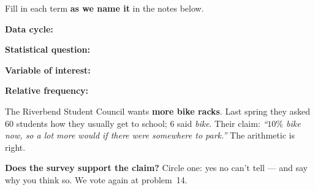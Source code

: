 \documentclass[12pt]{article}
\newcommand{\termrowheight}{2.3cm}
\newlength{\termrowinset}\setlength{\termrowinset}{7pt}
\newcommand{\vterm}[1]{%
  \par\noindent\begin{minipage}[t][\termrowheight][t]{\linewidth}%
    \vspace*{\termrowinset}%
    \textbf{\textcolor{cerulean}{#1:}}%
  \end{minipage}\par}
\begin{document}

\vspace{0.15in}

\begin{vocabbox}
\small
Fill in each term \textbf{as we name it} in the notes below.
\vterm{Data cycle}
\vterm{Statistical question}
\vterm{Variable of interest}
\vterm{Relative frequency}
\end{vocabbox}

\boxguard[12]
\begin{hookbox}
\small
The Riverbend Student Council wants \textbf{more bike racks}. Last spring they asked $60$
students how they usually get to school; $6$ said \emph{bike}. Their claim: \textit{``$10\%$ bike
now, so a lot more would if there were somewhere to park.''} The arithmetic is right.

\vspace{3pt}
\textbf{Does the survey support the claim?} Circle one: \quad yes \qquad no \qquad can't tell
\quad --- and say why you think so. We vote again at problem~14.
\par{}
\end{hookbox}
\end{document}
